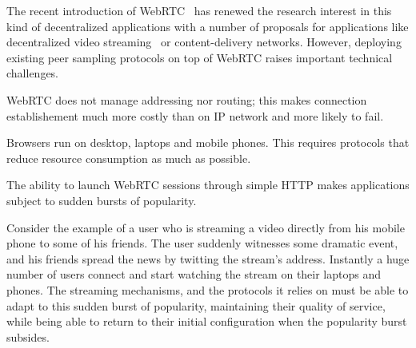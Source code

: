The recent introduction of WebRTC~\cite{webrtc} has renewed the
research interest in this kind of decentralized applications with a
number of proposals for applications like decentralized video
streaming~\cite{hivejs,smoothcache2} or content-delivery
networks\cite{Zhang:2013:MBC:2465351.2465379}. However, deploying
existing peer sampling protocols on top of WebRTC raises important
technical challenges. 
\begin{inparaenum}[(1)]
\item WebRTC does not manage addressing nor routing; this makes
  connection establishement much more costly than on IP network and
  more likely to fail. 
\item Browsers run on desktop, laptops and mobile phones. This
  requires protocols that reduce resource consumption as much as
  possible.
\item The ability to launch WebRTC sessions through simple HTTP makes
  applications subject to sudden bursts of popularity.  %
\end{inparaenum}
Consider the example of a user who is streaming a video directly from
his mobile phone to some of his friends. The user suddenly witnesses
some dramatic event, and his friends spread the news by twitting the
stream's address. Instantly a huge number of users connect and start
watching the stream on their laptops and phones. The streaming
mechanisms, and the protocols it relies on must be able to adapt to
this sudden burst of popularity, maintaining their quality of service,
while being able to return to their initial configuration when the
popularity burst subsides. 


